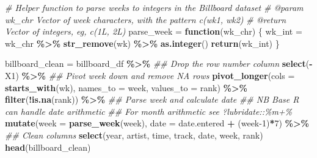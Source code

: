 \documentclass[
]{article}
\newenvironment{Shaded}{\begin{snugshade}}{\end{snugshade}}
\newcommand{\CommentTok}[1]{\textcolor[rgb]{0.56,0.35,0.01}{\textit{#1}}}
\newcommand{\ControlFlowTok}[1]{\textcolor[rgb]{0.13,0.29,0.53}{\textbf{#1}}}
\newcommand{\DataTypeTok}[1]{\textcolor[rgb]{0.13,0.29,0.53}{#1}}
\newcommand{\DecValTok}[1]{\textcolor[rgb]{0.00,0.00,0.81}{#1}}
\newcommand{\KeywordTok}[1]{\textcolor[rgb]{0.13,0.29,0.53}{\textbf{#1}}}
\newcommand{\NormalTok}[1]{#1}
\newcommand{\OperatorTok}[1]{\textcolor[rgb]{0.81,0.36,0.00}{\textbf{#1}}}
\newcommand{\StringTok}[1]{\textcolor[rgb]{0.31,0.60,0.02}{#1}}
\begin{document}
\begin{Shaded}
\begin{Highlighting}[]
\CommentTok{\#\textquotesingle{} Helper function to parse weeks to integers in the Billboard dataset}
\CommentTok{\#\textquotesingle{} @param wk\_chr Vector of week characters, with the pattern \textasciigrave{}c(\textquotesingle{}wk1\textquotesingle{}, \textquotesingle{}wk2\textquotesingle{})\textasciigrave{}}
\CommentTok{\#\textquotesingle{} @return Vector of integers, eg, \textasciigrave{}c(1L, 2L)\textasciigrave{}}
\NormalTok{parse\_week =}\StringTok{ }\ControlFlowTok{function}\NormalTok{(wk\_chr) \{}
\NormalTok{    wk\_int =}\StringTok{ }\NormalTok{wk\_chr }\OperatorTok{\%\textgreater{}\%}\StringTok{ }
\StringTok{        }\KeywordTok{str\_remove}\NormalTok{(}\StringTok{\textquotesingle{}wk\textquotesingle{}}\NormalTok{) }\OperatorTok{\%\textgreater{}\%}\StringTok{ }
\StringTok{        }\KeywordTok{as.integer}\NormalTok{()}
    \KeywordTok{return}\NormalTok{(wk\_int)}
\NormalTok{\}}

\NormalTok{billboard\_clean =}\StringTok{ }\NormalTok{billboard\_df }\OperatorTok{\%\textgreater{}\%}\StringTok{ }
\StringTok{    }\CommentTok{\#\# Drop the row number column}
\StringTok{    }\KeywordTok{select}\NormalTok{(}\OperatorTok{{-}}\NormalTok{X1) }\OperatorTok{\%\textgreater{}\%}\StringTok{ }
\StringTok{    }\CommentTok{\#\# Pivot week down and remove NA rows}
\StringTok{    }\KeywordTok{pivot\_longer}\NormalTok{(}\DataTypeTok{cols =} \KeywordTok{starts\_with}\NormalTok{(}\StringTok{\textquotesingle{}wk\textquotesingle{}}\NormalTok{), }
                 \DataTypeTok{names\_to =} \StringTok{\textquotesingle{}week\textquotesingle{}}\NormalTok{, }
                 \DataTypeTok{values\_to =} \StringTok{\textquotesingle{}rank\textquotesingle{}}\NormalTok{) }\OperatorTok{\%\textgreater{}\%}\StringTok{ }
\StringTok{    }\KeywordTok{filter}\NormalTok{(}\OperatorTok{!}\KeywordTok{is.na}\NormalTok{(rank)) }\OperatorTok{\%\textgreater{}\%}\StringTok{ }
\StringTok{    }\CommentTok{\#\# Parse week and calculate date}
\StringTok{    }\CommentTok{\#\# NB Base R can handle date arithmetic}
\StringTok{    }\CommentTok{\#\# For month arithmetic see ?lubridate::\textasciigrave{}\%m+\%\textasciigrave{}}
\StringTok{    }\KeywordTok{mutate}\NormalTok{(}\DataTypeTok{week =} \KeywordTok{parse\_week}\NormalTok{(week), }
           \DataTypeTok{date =}\NormalTok{ date.entered }\OperatorTok{+}\StringTok{ }\NormalTok{(week}\DecValTok{{-}1}\NormalTok{)}\OperatorTok{*}\DecValTok{7}\NormalTok{) }\OperatorTok{\%\textgreater{}\%}\StringTok{ }
\StringTok{    }\CommentTok{\#\# Clean columns}
\StringTok{    }\KeywordTok{select}\NormalTok{(year, artist, time, track, date, week, rank)}
\KeywordTok{head}\NormalTok{(billboard\_clean)}
\end{Highlighting}
\end{Shaded}
\end{document}
